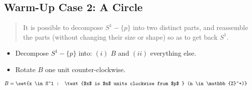 \documentclass[12pt]{extarticle}
\begin{document}
\subsection{Warm-Up Case 2: A Circle}\label{warm-up-case-2-a-circle}


\begin{quote}
It is possible to decompose $S^1 - \{p\}$ into two distinct parts, and reassemble the parts (without changing their size or shape) so as to get back $S^1$. 


\end{quote}





\begin{center}
\end{center}

\vspace{4mm}

\begin{itemize}

\item Decompose $S^1 - \{p\}$ into: $(i)$ $B$ and $(ii)$ everything else.

\item Rotate $B$ one unit counter-clockwise.
\end{itemize}

$$B = \set{x \in S^1 : \text{$x$ is $n$ units clockwise from $p$ } (n \in \mathbb{Z}^+)}$$
\end{document}
